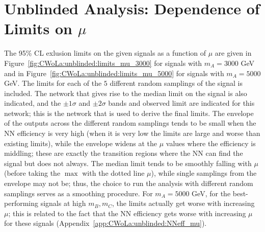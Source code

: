 \FloatBarrier
\section{Unblinded Analysis: Dependence of Limits on $\mu$}
\label{app:CWoLa:unblinded:limits_mu}
The 95\% CL exlusion limits on the given signals as a function of $\mu$ are given in Figure~\ref{fig:CWoLa:unblinded:limits_mu_3000} for signals with $m_A=3000$ GeV and in Figure~\ref{fig:CWoLa:unblinded:limits_mu_5000} for signals with $m_A=5000$ GeV.
The limits for each of the $5$ different random samplings of the signal is included.
The network that gives rise to the median limit on the signal is also indicated, and the $\pm1\sigma$ and $\pm2\sigma$ bands and observed limit are indicated for this network; this is the network that is used to derive the final limits.
The envelope of the outputs across the different random samplings tends to be small when the NN efficiency is very high (when it is very low the limits are large and worse than existing limits), while the envelope widens at the $\mu$ values where the efficiency is middling; these are exactly the transition regions where the NN can find the signal but does not always.
The median limit tends to be smoothly falling with $\mu$ (before taking the $\max$ with the dotted line $\mu$), while single samplings from the envelope may not be; thus, the choice to run the analysis with different random samplings serves as a smoothing procedure.
For $m_A=5000$ GeV, for the best-performing signals at high $m_B,m_C$, the limits actually get worse with increasing $\mu$; this is related to the fact that the NN efficiency gets worse with increasing $\mu$ for these signals (Appendix~\ref{app:CWoLa:unblinded:NNeff_mu}).

